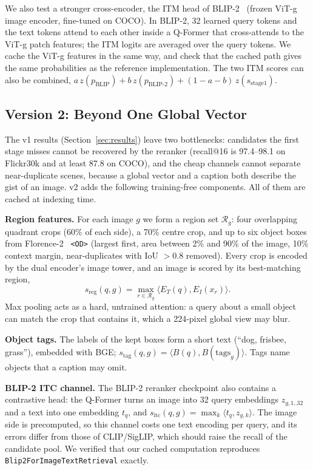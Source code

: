 \documentclass[conference]{IEEEtran}
\begin{document}
We also test a stronger cross-encoder, the ITM head of BLIP-2~\cite{li2023blip2} (frozen ViT-g image
encoder, fine-tuned on COCO). In BLIP-2, 32 learned query tokens and the text tokens attend to each other
inside a Q-Former that cross-attends to the ViT-g patch features; the ITM logits are averaged over the
query tokens. We cache the ViT-g features in the same way, and check that the cached path gives the same
probabilities as the reference implementation. The two ITM scores can also be combined,
$a\, z(p_\mathrm{BLIP}) + b\, z(p_\mathrm{BLIP\text{-}2}) + (1-a-b)\, z(s_\mathrm{stage1})$.

\subsection{Version 2: Beyond One Global Vector}
\label{sec:v2}
The v1 results (Section~\ref{sec:results}) leave two bottlenecks: candidates the first stage misses cannot be
recovered by the reranker (recall@16 is 97.4--98.1 on Flickr30k and at least 87.8 on COCO), and the cheap
channels cannot separate near-duplicate scenes, because a global vector and a caption both describe the gist of
an image. v2 adds the following training-free components. All of them are cached at indexing time.

\textbf{Region features.} For each image $g$ we form a region set $\mathcal{R}_g$: four overlapping quadrant
crops (60\% of each side), a 70\% centre crop, and up to six object boxes from Florence-2~\cite{xiao2024florence}
\texttt{<OD>} (largest first, area between 2\% and 90\% of the image, 10\% context margin, near-duplicates with
IoU $>0.8$ removed). Every crop is encoded by the dual encoder's image tower, and an image is scored by its
best-matching region,
\begin{equation}
s_\mathrm{reg}(q,g)=\max_{r\in\mathcal{R}_g}\langle E_T(q), E_I(x_r)\rangle .
\label{eq:region}
\end{equation}
Max pooling acts as a hard, untrained attention: a query about a small object can match the crop that
contains it, which a 224-pixel global view may blur.

\textbf{Object tags.} The labels of the kept boxes form a short text (``dog, frisbee, grass''), embedded with
BGE; $s_\mathrm{tag}(q,g)=\langle B(q), B(\mathrm{tags}_g)\rangle$. Tags name objects that a caption may omit.

\textbf{BLIP-2 ITC channel.} The BLIP-2 reranker checkpoint also contains a contrastive head: the Q-Former turns
an image into 32 query embeddings $z_{g,1..32}$ and a text into one embedding $t_q$, and
$s_\mathrm{itc}(q,g)=\max_k \langle t_q, z_{g,k}\rangle$. The image side is precomputed, so this channel costs one
text encoding per query, and its errors differ from those of CLIP/SigLIP, which should raise the recall of the
candidate pool. We verified that our cached computation reproduces
\texttt{Blip2ForImageTextRetrieval} exactly.
\end{document}
